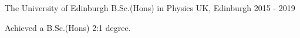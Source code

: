 


\begin{cventries}

  \cventry
    {The University of Edinburgh} %
    {B.Sc.(Hons) in Physics} %
    {UK, Edinburgh} %
    {2015 - 2019} %
    {
      \begin{cvitems} %
        \item{Achieved a B.Sc.(Hons) 2:1 degree.}
      \end{cvitems}
    }
    

\end{cventries}